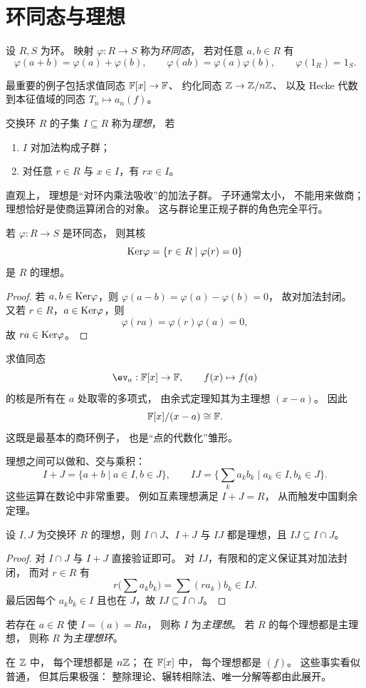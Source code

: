 \section{环同态与理想}
\begin{definition}
设 $R,S$ 为环。 映射 $\varphi:R\to S$ 称为\emph{环同态}， 若对任意 $a,b\in R$ 有
\[
\varphi(a+b)=\varphi(a)+\varphi(b),\qquad
\varphi(ab)=\varphi(a)\varphi(b),\qquad
\varphi(1_R)=1_S.
\]
\end{definition}
最重要的例子包括求值同态 $\mathbb{F}[x]\to \mathbb{F}$、 约化同态 $\mathbb{Z}\to \mathbb{Z}/n\mathbb{Z}$、 以及 Hecke 代数到本征值域的同态 $T_n\mapsto a_n(f)$。
\begin{definition}
交换环 $R$ 的子集 $I\subseteq R$ 称为\emph{理想}， 若
\begin{enumerate}[label=(\arabic*)]
\item $I$ 对加法构成子群；
\item 对任意 $r\in R$ 与 $x\in I$，有 $rx\in I$。
\end{enumerate}
\end{definition}
直观上， 理想是“对环内乘法吸收”的加法子群。 子环通常太小， 不能用来做商； 理想恰好是使商运算闭合的对象。 这与群论里正规子群的角色完全平行。
\begin{proposition}
若 $\varphi:R\to S$ 是环同态， 则其核
\[
\mathrm{Ker}\varphi=\{r\in R\mid \varphi(r)=0\}
\]
是 $R$ 的理想。
\end{proposition}
\begin{proof}
若 $a,b\in \mathrm{Ker}\varphi$，则 $\varphi(a-b)=\varphi(a)-\varphi(b)=0$， 故对加法封闭。 又若 $r\in R$，$a\in\mathrm{Ker}\varphi$，则
\[
\varphi(ra)=\varphi(r)\varphi(a)=0,
\]
故 $ra\in\mathrm{Ker}\varphi$。
\end{proof}
\begin{example}
求值同态
\[
\ev_a:\F[x]\to \F,
\qquad f(x)\mapsto f(a)
\]
的核是所有在 $a$ 处取零的多项式， 由余式定理知其为主理想 $(x-a)$。 因此
\[
\mathbb{F}[x]/(x-a)\cong \mathbb{F}.
\]
这既是最基本的商环例子， 也是“点的代数化”雏形。
\end{example}
理想之间可以做和、交与乘积：
\[
I+J=\{a+b\mid a\in I,b\in J\},
\qquad
IJ=\Big\{\sum_k a_kb_k\mid a_k\in I,b_k\in J\Big\}.
\]
这些运算在数论中非常重要。 例如互素理想满足 $I+J=R$， 从而触发中国剩余定理。
\begin{proposition}
设 $I,J$ 为交换环 $R$ 的理想，则 $I\cap J$、$I+J$ 与 $IJ$ 都是理想，且 $IJ\subseteq I\cap J$。
\end{proposition}
\begin{proof}
对 $I\cap J$ 与 $I+J$ 直接验证即可。 对 $IJ$，有限和的定义保证其对加法封闭， 而对 $r\in R$ 有
\[
r\Big(\sum a_kb_k\Big)=\sum (ra_k)b_k\in IJ.
\]
最后因每个 $a_kb_k\in I$ 且也在 $J$，故 $IJ\subseteq I\cap J$。
\end{proof}
\begin{definition}
若存在 $a\in R$ 使 $I=(a)=Ra$， 则称 $I$ 为\emph{主理想}。 若 $R$ 的每个理想都是主理想， 则称 $R$ 为\emph{主理想环}。
\end{definition}
在 $\mathbb{Z}$ 中， 每个理想都是 $n\mathbb{Z}$； 在 $\mathbb{F}[x]$ 中， 每个理想都是 $(f)$。 这些事实看似普通， 但其后果极强： 整除理论、辗转相除法、唯一分解等都由此展开。

